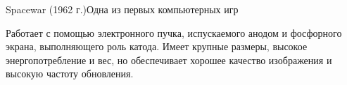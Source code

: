 \documentclass{beamer}
\begin{document}
\begin{frame}{Spacewar (1962 г.)}{Одна из первых компьютерных игр}
{		Работает с помощью электронного пучка, испускаемого анодом и фосфорного экрана, выполняющего роль катода. 
		Имеет крупные размеры, высокое энергопотребление и вес, но обеспечивает хорошее качество изображения и высокую частоту обновления.
		
		
		
		
	}
	
	\end{frame}
\end{document}
